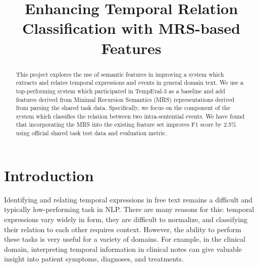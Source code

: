 \documentclass[11pt]{article}
\title{Enhancing Temporal Relation Classification with MRS-based Features}
\date{}
\begin{document}
\maketitle
\begin{abstract}
This project explores the use of semantic features in improving a system which extracts and relates temporal expressions and events in general domain text. We use a top-performing system which participated in TempEval-3 as a baseline and add features derived from Minimal Recursion Semantics (MRS) representations derived from parsing the shared task data. Specifically, we focus on the component of the system which classifies the relation between two intra-sentential events. We have found that incorporating the MRS into the existing feature set improves F1 score by 2.5\% using official shared task test data and evaluation metric.
\end{abstract}

\section{Introduction}
\label{intro}

%
% 

Identifying and relating temporal expressions in free text remains a difficult and typically low-performing task in NLP. There are many reasons for this: temporal expressions vary widely in form, they are difficult to normalize, and classifying their relation to each other requires context. However, the ability to perform these tasks is very useful for a variety of domains. For example, in the clinical domain, interpreting temporal information in clinical notes can give valuable insight into patient symptoms, diagnoses, and treatments.
\end{document}
